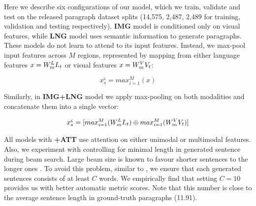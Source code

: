 \documentclass[11pt,a4paper]{article}
\begin{document}
Here we describe six configurations of our model, which we train, validate and test on the released paragraph dataset splits (14,575, 2,487, 2,489 for training, validation and testing respectively).
\textbf{IMG} model is conditioned only on visual features, while \textbf{LNG} model uses semantic information to generate paragraphs.
These models do not learn to attend to its input features.
Instead, we max-pool input features across $M$ regions, represented by mapping from either language features $x=W_{m}\sp{L} L_t$ or visual features $x=W_{m}\sp{V} V_t$:

\begin{equation}
    x^\varsigma_s =  max_{i=1}^M(x)
    \label{eqn:maxpool}
\end{equation}

Similarly, in \textbf{IMG+LNG} model we apply max-pooling on both modalities and concatenate them into a single vector:

\begin{equation}
    x^\varsigma_s = [max_{i=1}^M(W_{m}\sp{L} L_t) \oplus max_{i=1}^M(W_{m}\sp{V} V_t)]
    \label{eqn:maxpool}
\end{equation}

All models with \textbf{+ATT} use attention on either unimodal or multimodal features.
Also, we experiment with controlling for minimal length in generated sentence during beam search.
Large beam size is known to favour shorter sentences to the longer ones \cite{Yang2018}.
To avoid this problem, similar to , we ensure that each generated sentences consists of at least $C$ words.
We empirically find that setting $C=10$ provides us with better automatic metric scores.
Note that this number is close to the average sentence length in ground-truth paragraphs (11.91).
\end{document}
